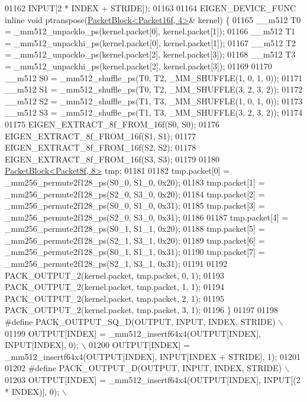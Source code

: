 \begin{DoxyCode}
01162 \textcolor{preprocessor}{                           INPUT[2 * INDEX + STRIDE]);}
01163 
01164 EIGEN\_DEVICE\_FUNC \textcolor{keyword}{inline} \textcolor{keywordtype}{void} ptranspose(\hyperlink{struct_eigen_1_1internal_1_1_packet_block}{PacketBlock<Packet16f, 4>}& kernel) \{
01165   \_\_m512 T0 = \_mm512\_unpacklo\_ps(kernel.packet[0], kernel.packet[1]);
01166   \_\_m512 T1 = \_mm512\_unpackhi\_ps(kernel.packet[0], kernel.packet[1]);
01167   \_\_m512 T2 = \_mm512\_unpacklo\_ps(kernel.packet[2], kernel.packet[3]);
01168   \_\_m512 T3 = \_mm512\_unpackhi\_ps(kernel.packet[2], kernel.packet[3]);
01169 
01170   \_\_m512 S0 = \_mm512\_shuffle\_ps(T0, T2, \_MM\_SHUFFLE(1, 0, 1, 0));
01171   \_\_m512 S1 = \_mm512\_shuffle\_ps(T0, T2, \_MM\_SHUFFLE(3, 2, 3, 2));
01172   \_\_m512 S2 = \_mm512\_shuffle\_ps(T1, T3, \_MM\_SHUFFLE(1, 0, 1, 0));
01173   \_\_m512 S3 = \_mm512\_shuffle\_ps(T1, T3, \_MM\_SHUFFLE(3, 2, 3, 2));
01174 
01175   EIGEN\_EXTRACT\_8f\_FROM\_16f(S0, S0);
01176   EIGEN\_EXTRACT\_8f\_FROM\_16f(S1, S1);
01177   EIGEN\_EXTRACT\_8f\_FROM\_16f(S2, S2);
01178   EIGEN\_EXTRACT\_8f\_FROM\_16f(S3, S3);
01179 
01180   \hyperlink{struct_eigen_1_1internal_1_1_packet_block}{PacketBlock<Packet8f, 8>} tmp;
01181 
01182   tmp.packet[0] = \_mm256\_permute2f128\_ps(S0\_0, S1\_0, 0x20);
01183   tmp.packet[1] = \_mm256\_permute2f128\_ps(S2\_0, S3\_0, 0x20);
01184   tmp.packet[2] = \_mm256\_permute2f128\_ps(S0\_0, S1\_0, 0x31);
01185   tmp.packet[3] = \_mm256\_permute2f128\_ps(S2\_0, S3\_0, 0x31);
01186 
01187   tmp.packet[4] = \_mm256\_permute2f128\_ps(S0\_1, S1\_1, 0x20);
01188   tmp.packet[5] = \_mm256\_permute2f128\_ps(S2\_1, S3\_1, 0x20);
01189   tmp.packet[6] = \_mm256\_permute2f128\_ps(S0\_1, S1\_1, 0x31);
01190   tmp.packet[7] = \_mm256\_permute2f128\_ps(S2\_1, S3\_1, 0x31);
01191 
01192   PACK\_OUTPUT\_2(kernel.packet, tmp.packet, 0, 1);
01193   PACK\_OUTPUT\_2(kernel.packet, tmp.packet, 1, 1);
01194   PACK\_OUTPUT\_2(kernel.packet, tmp.packet, 2, 1);
01195   PACK\_OUTPUT\_2(kernel.packet, tmp.packet, 3, 1);
01196 \}
01197 
01198 \textcolor{preprocessor}{#define PACK\_OUTPUT\_SQ\_D(OUTPUT, INPUT, INDEX, STRIDE)                \(\backslash\)}
01199 \textcolor{preprocessor}{  OUTPUT[INDEX] = \_mm512\_insertf64x4(OUTPUT[INDEX], INPUT[INDEX], 0); \(\backslash\)}
01200 \textcolor{preprocessor}{  OUTPUT[INDEX] = \_mm512\_insertf64x4(OUTPUT[INDEX], INPUT[INDEX + STRIDE], 1);}
01201 
01202 \textcolor{preprocessor}{#define PACK\_OUTPUT\_D(OUTPUT, INPUT, INDEX, STRIDE)                         \(\backslash\)}
01203 \textcolor{preprocessor}{  OUTPUT[INDEX] = \_mm512\_insertf64x4(OUTPUT[INDEX], INPUT[(2 * INDEX)], 0); \(\backslash\)}

\end{DoxyCode}
